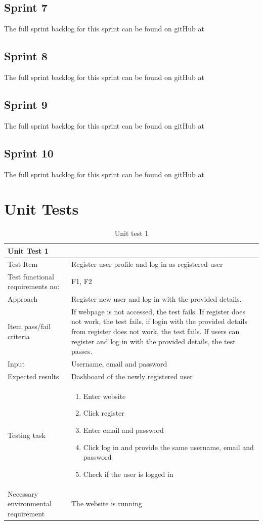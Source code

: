 \section{Sprint 7}\label{sprint7}
The full sprint backlog for this sprint can be found on gitHub at \cite{sprint7}
\section{Sprint 8}\label{sprint8}
The full sprint backlog for this sprint can be found on gitHub at \cite{sprint8}
\section{Sprint 9}\label{sprint9}
The full sprint backlog for this sprint can be found on gitHub at \cite{sprint9}
\section{Sprint 10}\label{sprint10}
The full sprint backlog for this sprint can be found on gitHub at \cite{sprint10}


\chapter{Unit Tests}\label{unitTests}
\begin{table}[H]
\begin{tabular}{ | L{0.25\linewidth} | L{0.75\linewidth} | } 
 \hline {}
 Unit Test 1 &  \\
 \hline
 Test Item & Register user profile and log in as registered user \\ 
 \hline
 Test functional requirements no: & F1, F2
 \\ 
 \hline
 Approach & Register new user and log in with the provided details. \\ 
  \hline
 Item pass/fail criteria &  If webpage is not accessed, the test fails. If register does not work, the test fails, if login with the provided details from register does not work, the test fails. If users can register and log in with the provided details, the test passes. \\ 
 \hline
 Input &  Username, email and password\\ 
 \hline
 Expected results & Dashboard of the newly registered user \\ 
  \hline
Testing task & 
\vspace{-5mm}
    \begin{enumerate}[noitemsep]
  \item Enter website
  \item Click register
  \item Enter email and password
  \item Click log in and provide the same username, email and password
  \item Check if the user is logged in
   \end{enumerate}\\
 \hline
 Necessary environmental requirement & The website is running \\ 
 \hline
\end{tabular}
\caption{Unit test 1}
\end{table}

